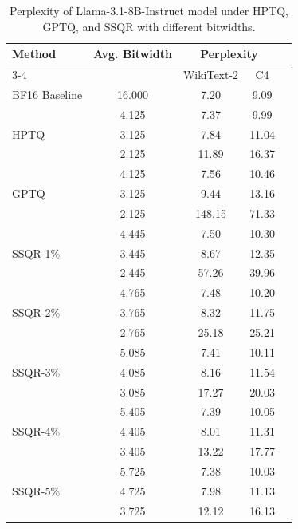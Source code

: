 \documentclass{article} %
\begin{document}
\begin{table}[htpb]
\caption{Perplexity of Llama-3.1-8B-Instruct model under HPTQ, GPTQ, and SSQR with different bitwidths.}
\label{tab:llama3.1_8b_results}
\begin{center}
\begin{tabular}{lcccc}
\toprule
Method & Avg. Bitwidth & \multicolumn{2}{c}{Perplexity}  \\
\cmidrule(r){3-4}
      &           & WikiText-2 & C4 \\
\midrule
BF16 Baseline & 16.000 & 7.20 & 9.09 \\
\midrule
\multirow{3}{*}{HPTQ} & 4.125 & 7.37 & 9.99 \\
           & 3.125 & 7.84 & 11.04 \\
           & 2.125 & 11.89 & 16.37  \\
\midrule
\multirow{3}{*}{GPTQ} & 4.125 & 7.56 & 10.46 \\
           & 3.125 & 9.44	& 13.16 \\
           & 2.125 & 148.15 & 71.33 \\
\midrule
\multirow{3}{*}{SSQR-1\%} & 4.445 & 7.50 & 10.30 \\
           & 3.445 & 8.67 & 12.35 \\
           & 2.445 & 57.26 & 39.96 \\
\midrule
\multirow{3}{*}{SSQR-2\%} & 4.765 & 7.48 & 10.20 \\
           & 3.765 & 8.32	& 11.75 \\
           & 2.765 & 25.18 & 25.21 \\
\midrule
\multirow{3}{*}{SSQR-3\%} & 5.085 & 7.41 & 10.11 \\
           & 4.085 & 8.16	& 11.54 \\
           & 3.085 & 17.27 & 20.03 \\
\midrule
\multirow{3}{*}{SSQR-4\%} & 5.405 & 7.39 & 10.05 \\
           & 4.405 & 8.01	& 11.31 \\
           & 3.405 & 13.22 & 17.77 \\
\midrule
\multirow{3}{*}{SSQR-5\%} & 5.725 & 7.38 & 10.03 \\
           & 4.725 & 7.98	& 11.13 \\
           & 3.725 & 12.12 & 16.13 \\
\bottomrule
\end{tabular}
\end{center}
\end{table}
\end{document}
